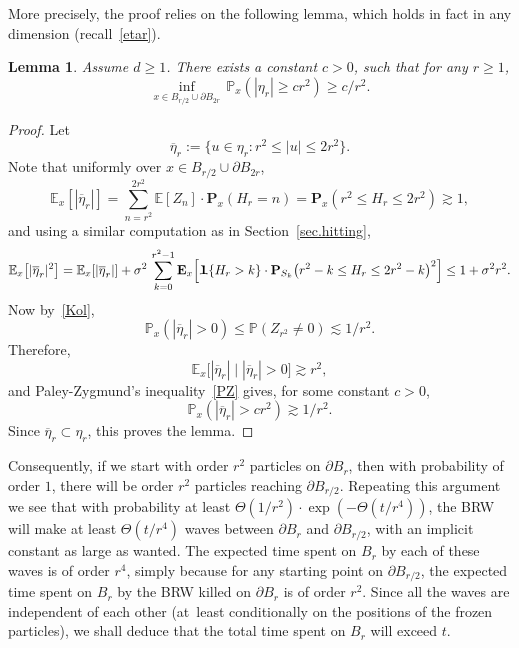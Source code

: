 \documentclass[JEP,XML,SOM,Unicode,NoFloatCountersInSection,published]{cedram}
\theoremstyle{plain}
\newtheorem{lemma}[theorem]{Lemma}
\theoremstyle{definition}
\newcommand{\1}{{\text{\Large $\mathfrak 1$}}}
\begin{document}
More precisely, the proof relies on the following lemma, which holds in fact in any dimension (recall~\eqref{etar}).
\begin{lemma}\label{lem.inf.etar} Assume $d\ge 1$.
There exists a constant $c>0$, such that for any $r\ge 1$,
\[
\inf_{x\in B_{r/2}\cup \partial B_{2r}} \, \mathbb P_x(|\eta_r|\ge cr^2) \geq c/r^2.
\]
\end{lemma}

\begin{proof} Let
\[
\overline{\eta}_r := \{u\in \eta_r : r^2\le |u|\le 2r^2\}.
\]
Note that uniformly over $x\in B_{r/2} \cup \partial B_{2r}$,
\[
\mathbb E_x[|\overline{\eta}_r|] = \sum_{n=r^2}^{2r^2} \mathbb E[Z_n]
\cdot \mathbf P_x(H_r = n ) = \mathbf P_x(r^2\le H_r\le 2r^2 ) \gtrsim 1,
\]
and using a similar computation as in Section~\ref{sec.hitting},
\begin{equation*}
\mathbb E_x\big[|\overline{\eta}_r|^2\big] =
\mathbb E_x[|\overline{\eta}_r|] + \sigma^2\, \sum_{k=0}^{r^2-1}
\mathbf E_x\Big[\1\{H_r>k\}\cdot
\mathbf P_{S_k}\big(r^2-k\le H_r\le 2r^2-k\big)^2\Big] \le 1+\sigma^2 r^2.
\end{equation*}
Now by~\eqref{Kol},
\[
\mathbb P_x(|\overline{\eta}_r|>0 ) \le \mathbb P(Z_{r^2}\neq 0) \lesssim 1/r^2.
\]
Therefore,
\[
\mathbb E_x\big[|\overline{\eta}_r| \mid |\overline{\eta}_r|>0\big] \gtrsim r^2,
\]
and Paley-Zygmund's inequality~\eqref{PZ} gives, for some constant $c>0$,
\[
\mathbb P_x\left(|\overline{\eta}_r| > cr^2\right) \gtrsim 1/r^2.
\]
Since $\overline{\eta}_r\subset \eta_r$, this proves the lemma.
\end{proof}

Consequently, if we start with order $r^2$ particles on $\partial B_r$, then with probability of order $1$, there will be order $r^2$ particles reaching
$\partial B_{r/2}$. Repeating this argument we see that with probability at least
$\Theta(1/r^2) \cdot \exp(-\Theta(t/r^4))$, the BRW will
make at least $\Theta(t/r^4)$ waves between $\partial B_r$ and $\partial B_{r/2}$, with an implicit constant as large as wanted.
The expected time spent on $B_r$ by each of these waves is of
order $r^4$, simply because for any starting point on $\partial B_{r/2}$, the expected time spent on $B_r$ by the BRW killed on $\partial B_r$ is
of order $r^2$.
Since all the waves are independent of each other (at~least conditionally on the positions of the frozen particles), we shall deduce
that the total time spent on $B_r$ will exceed $t$.
\end{document}
